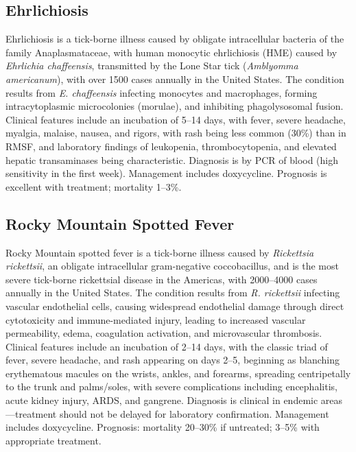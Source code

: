 \subsection{Ehrlichiosis}
\label{sec:Ehrlichiosis}
Ehrlichiosis is a tick-borne illness caused by obligate intracellular bacteria of the family Anaplasmataceae, with human monocytic ehrlichiosis (HME) caused by \textit{Ehrlichia chaffeensis}, transmitted by the Lone Star tick (\textit{Amblyomma americanum}), with over 1500 cases annually in the United States. The condition results from \textit{E. chaffeensis} infecting monocytes and macrophages, forming intracytoplasmic microcolonies (morulae), and inhibiting phagolysosomal fusion. Clinical features include an incubation of 5--14 days, with fever, severe headache, myalgia, malaise, nausea, and rigors, with rash being less common (30\%) than in RMSF, and laboratory findings of leukopenia, thrombocytopenia, and elevated hepatic transaminases being characteristic. Diagnosis is by PCR of blood (high sensitivity in the first week). Management includes doxycycline. Prognosis is excellent with treatment; mortality 1--3\%.

\subsection{Rocky Mountain Spotted Fever}
\label{sec:Rocky Mountain Spotted Fever}
Rocky Mountain spotted fever is a tick-borne illness caused by \textit{Rickettsia rickettsii}, an obligate intracellular gram-negative coccobacillus, and is the most severe tick-borne rickettsial disease in the Americas, with 2000--4000 cases annually in the United States. The condition results from \textit{R. rickettsii} infecting vascular endothelial cells, causing widespread endothelial damage through direct cytotoxicity and immune-mediated injury, leading to increased vascular permeability, edema, coagulation activation, and microvascular thrombosis. Clinical features include an incubation of 2--14 days, with the classic triad of fever, severe headache, and rash appearing on days 2--5, beginning as blanching erythematous macules on the wrists, ankles, and forearms, spreading centripetally to the trunk and palms/soles, with severe complications including encephalitis, acute kidney injury, ARDS, and gangrene. Diagnosis is clinical in endemic areas---treatment should not be delayed for laboratory confirmation. Management includes doxycycline. Prognosis: mortality 20--30\% if untreated; 3--5\% with appropriate treatment.

